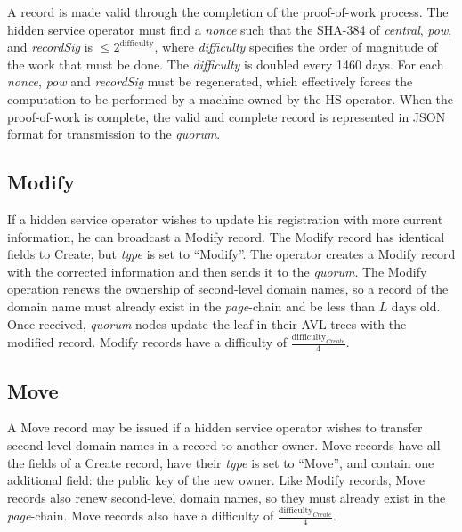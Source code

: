 A record is made valid through the completion of the proof-of-work process. The hidden service operator must find a \emph{nonce} such that the SHA-384 of \emph{central}, \emph{pow}, and \emph{recordSig} is $ \leq 2^\textrm{difficulty} $, where \emph{difficulty} specifies the order of magnitude of the work that must be done. The \emph{difficulty} is doubled every 1460 days. For each \emph{nonce}, \emph{pow} and \emph{recordSig} must be regenerated, which effectively forces the computation to be performed by a machine owned by the HS operator. When the proof-of-work is complete, the valid and complete record is represented in JSON format for transmission to the \emph{quorum}.


\subsection{Modify}

If a hidden service operator wishes to update his registration with more current information, he can broadcast a Modify record. The Modify record has identical fields to Create, but \emph{type} is set to ``Modify''. The operator creates a Modify record with the corrected information and then sends it to the \emph{quorum}. The Modify operation renews the ownership of second-level domain names, so a record of the domain name must already exist in the \emph{page}-chain and be less than $ L $ days old. Once received, \emph{quorum} nodes update the leaf in their AVL trees with the modified record. Modify records have a difficulty of $ \frac{\textrm{difficulty}_{Create}}{4} $.

\subsection{Move}


A Move record may be issued if a hidden service operator wishes to transfer second-level domain names in a record to another owner. Move records have all the fields of a Create record, have their \emph{type} is set to ``Move'', and contain one additional field: the public key of the new owner. Like Modify records, Move records also renew second-level domain names, so they must already exist in the \emph{page}-chain. Move records also have a difficulty of $ \frac{\textrm{difficulty}_{Create}}{4} $.

